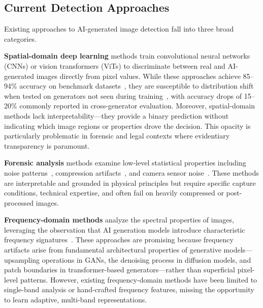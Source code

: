 \documentclass[journal]{IEEEtran}
\begin{document}
\subsection{Current Detection Approaches}
Existing approaches to AI-generated image detection fall into three broad categories.

\textbf{Spatial-domain deep learning} methods train convolutional neural networks (CNNs) or vision transformers (ViTs) to discriminate between real and AI-generated images directly from pixel values. While these approaches achieve 85--94\% accuracy on benchmark datasets~\cite{wang2020, chollet2017}, they are susceptible to distribution shift when tested on generators not seen during training~\cite{guarnera2022}, with accuracy drops of 15--20\% commonly reported in cross-generator evaluation. Moreover, spatial-domain methods lack interpretability---they provide a binary prediction without indicating which image regions or properties drove the decision. This opacity is particularly problematic in forensic and legal contexts where evidentiary transparency is paramount.

\textbf{Forensic analysis} methods examine low-level statistical properties including noise patterns~\cite{boroumand2020}, compression artifacts~\cite{bondi2019}, and camera sensor noise~\cite{cozzolino2019}. These methods are interpretable and grounded in physical principles but require specific capture conditions, technical expertise, and often fail on heavily compressed or post-processed images.

\textbf{Frequency-domain methods} analyze the spectral properties of images, leveraging the observation that AI generation models introduce characteristic frequency signatures~\cite{frank2020, durall2021, zhang2023}. These approaches are promising because frequency artifacts arise from fundamental architectural properties of generative models---upsampling operations in GANs, the denoising process in diffusion models, and patch boundaries in transformer-based generators---rather than superficial pixel-level patterns. However, existing frequency-domain methods have been limited to single-band analysis or hand-crafted frequency features, missing the opportunity to learn adaptive, multi-band representations.
\end{document}
